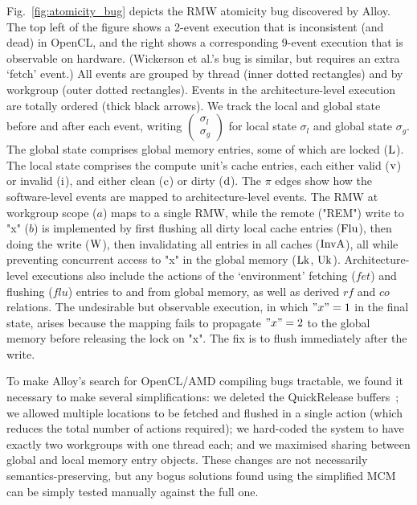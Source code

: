 Fig.~\ref{fig:atomicity_bug} depicts the RMW atomicity bug discovered
by Alloy. The top left of the figure shows a 2-event execution that is
inconsistent (and dead) in OpenCL, and the right shows a corresponding
9-event execution that is observable on hardware. (Wickerson et al.'s
bug is similar, but requires an extra `fetch' event.) All events are
grouped by thread (inner dotted rectangles) and by workgroup (outer
dotted rectangles). Events in the architecture-level execution are
totally ordered (thick black arrows). We track the local and global
state before and after each event, writing
$\left(\begin{smallmatrix}\sigma_l\\\sigma_g\end{smallmatrix}\right)$
for local state $\sigma_l$ and global state $\sigma_g$. The global
state comprises global memory entries, some of which are locked
(${\rm L}$). The local state comprises the compute unit's cache
entries, each either valid (${\rm v}$) or invalid (${\rm i}$), and
either clean (${\rm c}$) or dirty (${\rm d}$). The $\pi$ edges show
how the software-level events are mapped to architecture-level events.
The RMW at workgroup scope ($a$) maps to a single RMW, while the
remote ("REM") write to "x" ($b$) is implemented by first flushing all
dirty local cache entries (${\rm Flu}$), then doing the write
(${\rm W}$), then invalidating all entries in all caches
(${\rm InvA}$), all while preventing concurrent access to "x" in the
global memory (${\rm Lk}$, ${\rm Uk}$). Architecture-level executions
also include the actions of the `environment' fetching ($fet$) and
flushing ($flu$) entries to and from global memory, as well as derived
$rf$ and $co$ relations. The undesirable but observable execution, in
which $"x"=1$ in the final state, arises because the mapping fails to
propagate $"x"=2$ to the global memory before releasing the lock on
"x". The fix is to flush immediately after the write.

To make Alloy's search for OpenCL/AMD compiling bugs tractable, we
found it necessary to make several simplifications: we deleted the
QuickRelease buffers~\cite{hechtman+14}; we allowed multiple locations
to be fetched and flushed in a single action (which reduces the total
number of actions required); we hard-coded the system to have exactly
two workgroups with one thread each; and we maximised sharing between
global and local memory entry objects. These changes are not
necessarily semantics-preserving, but any bogus solutions found using
the simplified MCM can be simply tested manually against the full one.



